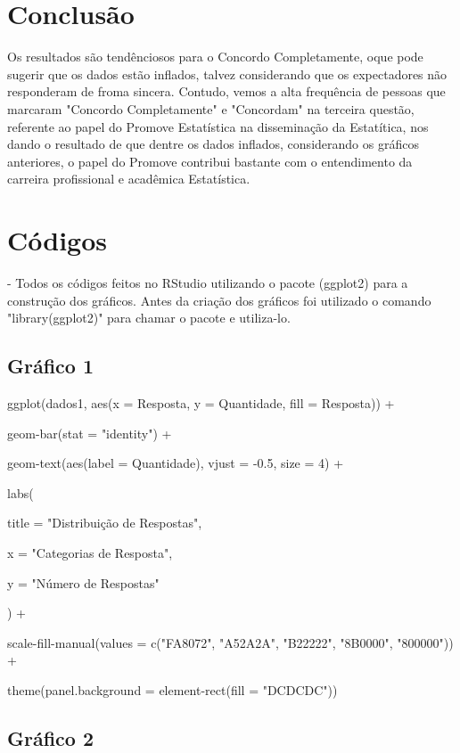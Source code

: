 \documentclass{article}
\begin{document}
\section{Conclusão}

Os resultados são tendênciosos para o Concordo Completamente, oque pode sugerir que os dados estão inflados, talvez considerando que os expectadores não responderam de froma sincera. Contudo, vemos a alta frequência de pessoas que marcaram "Concordo Completamente" e "Concordam" na terceira questão, referente ao papel do Promove Estatística na disseminação da Estatítica, nos dando o resultado de que dentre os dados inflados, considerando os gráficos anteriores, o papel do Promove contribui bastante com o entendimento da carreira profissional e acadêmica Estatística.

\section{Códigos}

- Todos os códigos feitos no RStudio utilizando o pacote (ggplot2) para a construção dos gráficos. Antes da criação dos gráficos foi utilizado o comando "library(ggplot2)" para chamar o pacote e utiliza-lo.

\subsection{Gráfico 1}
\newpage

ggplot(dados1, aes(x = Resposta, y = Quantidade, fill = Resposta)) +

  geom-bar(stat = "identity") +
  
  geom-text(aes(label = Quantidade), vjust = -0.5, size = 4) +
  
  labs(
  
    title = "Distribuição de Respostas",
    
    x = "Categorias de Resposta", 
    
    y = "Número de Respostas"
    
  ) +
  
  scale-fill-manual(values = c("FA8072", "A52A2A", "B22222", "8B0000", "800000")) +
  
  theme(panel.background = element-rect(fill = "DCDCDC"))

\subsection{Gráfico 2}
\end{document}
